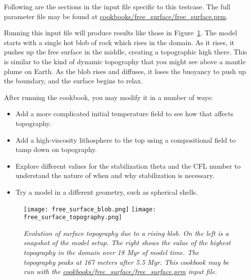 Following are the sections in the input file specific to this testcase.  The full parameter
file may be found at \url{cookbooks/free_surface/free_surface.prm}.



Running this input file will produce results like those in Figure~\ref{fig:freesurface}.
The model starts with a single hot blob of rock which rises in the domain.  As it 
rises, it pushes up the free surface in the middle, creating a topographic high there.
This is similar to the kind of dynamic topography that you might see above a mantle 
plume on Earth.  As the blob rises and diffuses, it loses the buoyancy to push up 
the boundary, and the surface begins to relax.

After running the cookbook, you may modify it in a number of ways:
\begin{itemize}
\item Add a more complicated initial temperature field to see how that affects topography.
\item Add a high-viscosity lithosphere to the top using a compositional field to tamp down on topography.
\item Explore different values for the stabilization theta and the CFL number to understand the nature of when and why stabilization is necessary.
\item Try a model in a different geometry, such as spherical shells.
\end{itemize}

\begin{figure}
  \centering
  \texttt{[image: free\_surface\_blob.png]}
  \hfill
  \texttt{[image: free\_surface\_topography.png]}
  \caption{\it Evolution of surface topography due to a rising blob.  On the left is a 
           snapshot of the model setup.  The right shows the value of the highest 
           topography in the domain over 18 Myr of model time.  The topography peaks
           at 167 meters after 5.5 Myr.  This cookbook may be run with the
           \url{cookbooks/free_surface/free_surface.prm} input file.}
  \label{fig:freesurface}
\end{figure}
